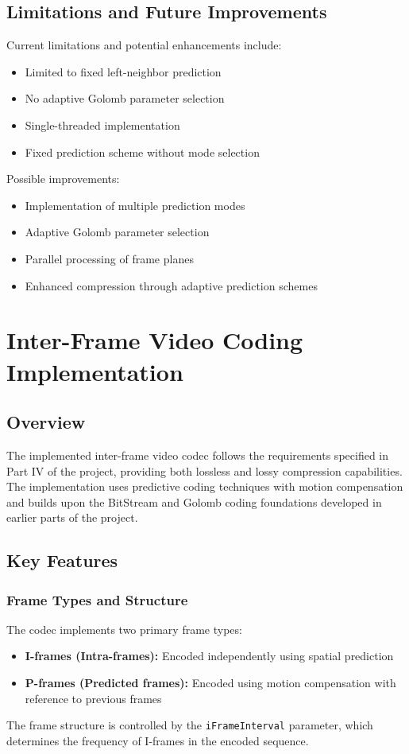 \documentclass[a4paper,14pt]{article}
\begin{document}
\subsection{Limitations and Future Improvements}
Current limitations and potential enhancements include:
\begin{itemize}
    \item Limited to fixed left-neighbor prediction
    \item No adaptive Golomb parameter selection
    \item Single-threaded implementation
    \item Fixed prediction scheme without mode selection
\end{itemize}

Possible improvements:
\begin{itemize}
    \item Implementation of multiple prediction modes
    \item Adaptive Golomb parameter selection
    \item Parallel processing of frame planes
    \item Enhanced compression through adaptive prediction schemes
\end{itemize}

\section{Inter-Frame Video Coding Implementation}
\subsection{Overview}
The implemented inter-frame video codec follows the requirements specified in Part IV of the project, providing both lossless and lossy compression capabilities. The implementation uses predictive coding techniques with motion compensation and builds upon the BitStream and Golomb coding foundations developed in earlier parts of the project.
\subsection{Key Features}
\subsubsection{Frame Types and Structure}
The codec implements two primary frame types:
\begin{itemize}
\item \textbf{I-frames (Intra-frames):} Encoded independently using spatial prediction
\item \textbf{P-frames (Predicted frames):} Encoded using motion compensation with reference to previous frames
\end{itemize}
The frame structure is controlled by the \texttt{iFrameInterval} parameter, which determines the frequency of I-frames in the encoded sequence.
\end{document}
